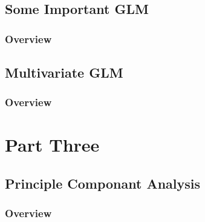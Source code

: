 \documentclass[11pt,fleqn]{book} %
\begin{document}

\chapter{Some Important GLM}

\section{Overview}



\chapter{Multivariate GLM}

\section{Overview}



 \part{Part Three}



\chapter{Principle Componant Analysis}

\section{Overview}
\end{document}
